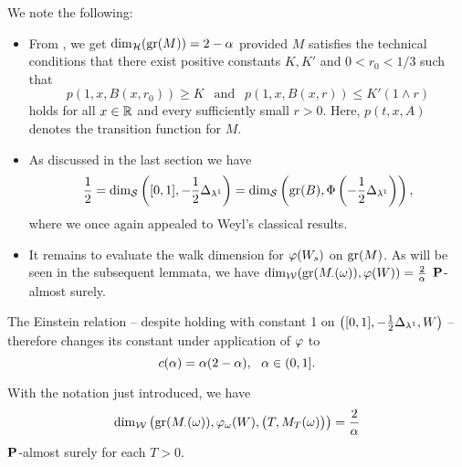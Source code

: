 We note the following:
\begin{itemize}
  \item From \cite{liu1998hausdorff}, we get $\dim_{\mathcal{H}}(\operatorname{gr}(M))=2-\alpha$ provided $M$ satisfies the technical conditions that there exist positive constants $K,K'$ and $0<r_0<1/3$ such that 
  \begin{equation}
    p(1,x,B(x,r_0))\geq K\ \ \text{ and }\ \ 
    p(1,x,B(x,r))\leq K'(1\wedge r)
  \end{equation}
  holds for all $x\in\mathbb{R}$ and every sufficiently small $r>0$. Here, $p(t,x,A)$ denotes the transition function for $M$.
  \item As discussed in the last section we have
  \[
    \frac{1}{2}=\dim_{\mathcal{S}}\left([0,1],-\frac{1}{2}\Delta_{\lambda^1}\right)
    =\dim_{\mathcal{S}}\left(\operatorname{gr}(B),\Phi \left(-\frac{1}{2}\Delta_{\lambda^1}\right)\right),
  \]
  where we once again appealed to Weyl's classical results. 
  \item It remains to evaluate the walk dimension for $\varphi(W_s)$ on 
  $\operatorname{gr}(M)$. As will be seen in the subsequent lemmata, we have 
  $\dim_{\mathcal{W}}(\operatorname{gr}(M_\cdot(\omega)),\varphi(W))=\frac{2}{\alpha}$ $\mathbf{P}$-almost surely.
\end{itemize}
The Einstein relation -- despite holding with constant 1 on 
$\left([0,1],-\frac{1}{2}\Delta_{\lambda^1},W\right)$ -- therefore changes its constant under application of $\varphi$ to
\[
  c(\alpha)=\alpha(2-\alpha),\ \ \alpha\in(0,1].
\]
\begin{lem}
  With the notation just introduced, we have 
  \begin{equation}\label{eq:BMdimw}
    \dim_{\mathcal{W}}\left(\operatorname{gr}(M_\cdot(\omega)),\varphi_\omega(W),\big(T,M_T(\omega)\big)\right)
    =\frac{2}{\alpha}
  \end{equation}
  $\mathbf{P}$-almost surely for each $T>0$.
\end{lem}

